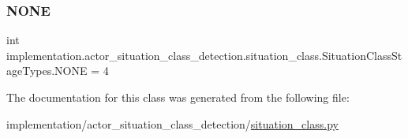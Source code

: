 \subsubsection{\texorpdfstring{N\+O\+NE}{NONE}}
{\footnotesize\ttfamily int implementation.\+actor\+\_\+situation\+\_\+class\+\_\+detection.\+situation\+\_\+class.\+Situation\+Class\+Stage\+Types.\+N\+O\+NE = 4\hspace{0.3cm}{\ttfamily [static]}}



The documentation for this class was generated from the following file\+:\begin{DoxyCompactItemize}
\item 
implementation/actor\+\_\+situation\+\_\+class\+\_\+detection/\hyperlink{situation__class_8py}{situation\+\_\+class.\+py}\end{DoxyCompactItemize}

